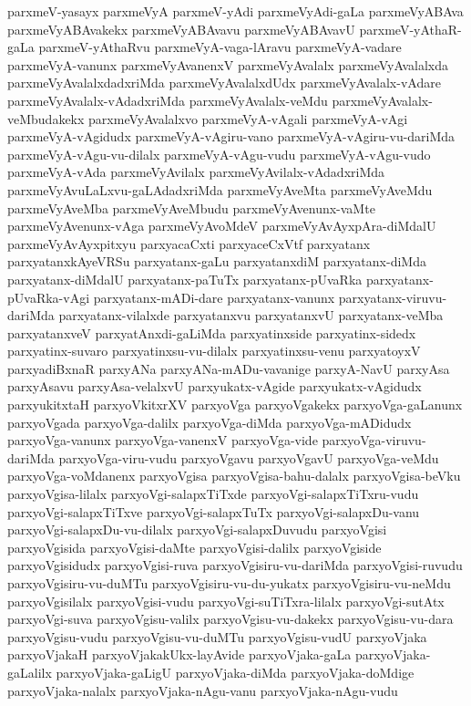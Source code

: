 {parxmeV-yasayx
parxmeVyA
parxmeV-yAdi
parxmeVyAdi-gaLa
parxmeVyABAva
parxmeVyABAvakekx
parxmeVyABAvavu
parxmeVyABAvavU
parxmeV-yAthaR-gaLa
parxmeV-yAthaRvu
parxmeVyA-vaga-lAravu
parxmeVyA-vadare
parxmeVyA-vanunx
parxmeVyAvanenxV
parxmeVyAvalalx
parxmeVyAvalalxda
parxmeVyAvalalxdadxriMda
parxmeVyAvalalxdUdx
parxmeVyAvalalx-vAdare
parxmeVyAvalalx-vAdadxriMda
parxmeVyAvalalx-veMdu
parxmeVyAvalalx-veMbudakekx
parxmeVyAvalalxvo
parxmeVyA-vAgali
parxmeVyA-vAgi
parxmeVyA-vAgidudx
parxmeVyA-vAgiru-vano
parxmeVyA-vAgiru-vu-dariMda
parxmeVyA-vAgu-vu-dilalx
parxmeVyA-vAgu-vudu
parxmeVyA-vAgu-vudo
parxmeVyA-vAda
parxmeVyAvilalx
parxmeVyAvilalx-vAdadxriMda
parxmeVyAvuLaLxvu-gaLAdadxriMda
parxmeVyAveMta
parxmeVyAveMdu
parxmeVyAveMba
parxmeVyAveMbudu
parxmeVyAvenunx-vaMte
parxmeVyAvenunx-vAga
parxmeVyAvoMdeV
parxmeVyAvAyxpAra-diMdalU
parxmeVyAvAyxpitxyu
parxyacaCxti
parxyaceCxVtf
parxyatanx
parxyatanxkAyeVRSu
parxyatanx-gaLu
parxyatanxdiM
parxyatanx-diMda
parxyatanx-diMdalU
parxyatanx-paTuTx
parxyatanx-pUvaRka
parxyatanx-pUvaRka-vAgi
parxyatanx-mADi-dare
parxyatanx-vanunx
parxyatanx-viruvu-dariMda
parxyatanx-vilalxde
parxyatanxvu
parxyatanxvU
parxyatanx-veMba
parxyatanxveV
parxyatAnxdi-gaLiMda
parxyatinxside
parxyatinx-sidedx
parxyatinx-suvaro
parxyatinxsu-vu-dilalx
parxyatinxsu-venu
parxyatoyxV
parxyadiBxnaR
parxyANa
parxyANa-mADu-vavanige
parxyA-NavU
parxyAsa
parxyAsavu
parxyAsa-velalxvU
parxyukatx-vAgide
parxyukatx-vAgidudx
parxyukitxtaH
parxyoVkitxrXV
parxyoVga
parxyoVgakekx
parxyoVga-gaLanunx
parxyoVgada
parxyoVga-dalilx
parxyoVga-diMda
parxyoVga-mADidudx
parxyoVga-vanunx
parxyoVga-vanenxV
parxyoVga-vide
parxyoVga-viruvu-dariMda
parxyoVga-viru-vudu
parxyoVgavu
parxyoVgavU
parxyoVga-veMdu
parxyoVga-voMdanenx
parxyoVgisa
parxyoVgisa-bahu-dalalx
parxyoVgisa-beVku
parxyoVgisa-lilalx
parxyoVgi-salapxTiTxde
parxyoVgi-salapxTiTxru-vudu
parxyoVgi-salapxTiTxve
parxyoVgi-salapxTuTx
parxyoVgi-salapxDu-vanu
parxyoVgi-salapxDu-vu-dilalx
parxyoVgi-salapxDuvudu
parxyoVgisi
parxyoVgisida
parxyoVgisi-daMte
parxyoVgisi-dalilx
parxyoVgiside
parxyoVgisidudx
parxyoVgisi-ruva
parxyoVgisiru-vu-dariMda
parxyoVgisi-ruvudu
parxyoVgisiru-vu-duMTu
parxyoVgisiru-vu-du-yukatx
parxyoVgisiru-vu-neMdu
parxyoVgisilalx
parxyoVgisi-vudu
parxyoVgi-suTiTxra-lilalx
parxyoVgi-sutAtx
parxyoVgi-suva
parxyoVgisu-valilx
parxyoVgisu-vu-dakekx
parxyoVgisu-vu-dara
parxyoVgisu-vudu
parxyoVgisu-vu-duMTu
parxyoVgisu-vudU
parxyoVjaka
parxyoVjakaH
parxyoVjakakUkx-layAvide
parxyoVjaka-gaLa
parxyoVjaka-gaLalilx
parxyoVjaka-gaLigU
parxyoVjaka-diMda
parxyoVjaka-doMdige
parxyoVjaka-nalalx
parxyoVjaka-nAgu-vanu
parxyoVjaka-nAgu-vudu
}

